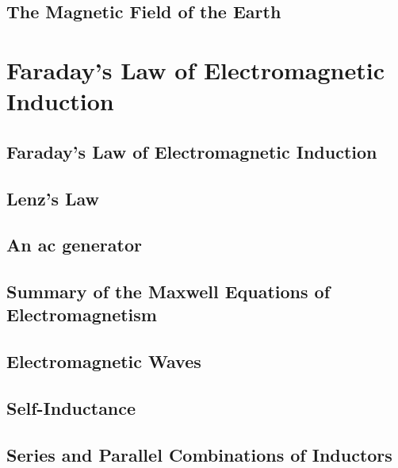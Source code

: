 \documentclass[twocolumn]{article}
\begin{document}
\subsection{The Magnetic Field of the Earth}
\begin{outline}
	\1 
\end{outline}
\section{Faraday's Law of Electromagnetic Induction}
\subsection{Faraday's Law of Electromagnetic Induction}
\begin{outline}
	\1 
\end{outline}
\subsection{Lenz's Law}
\begin{outline}
	\1 
\end{outline}
\subsection{An ac generator}
\begin{outline}
	\1 
\end{outline}
\subsection{Summary of the Maxwell Equations of Electromagnetism}
\begin{outline}
	\1 
\end{outline}
\subsection{Electromagnetic Waves}
\begin{outline}
	\1 
\end{outline}
\subsection{Self-Inductance}
\begin{outline}
	\1 
\end{outline}
\subsection{Series and Parallel Combinations of Inductors}
\begin{outline}
	\1 
\end{outline}
\end{document}

